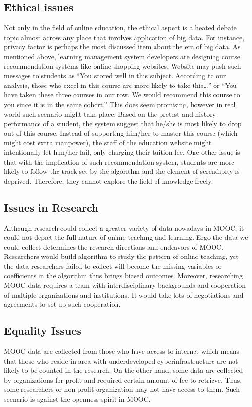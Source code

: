 \documentclass[sigconf]{acmart}
\begin{document}
\subsection{Ethical issues} 
Not only in the field of online education, the ethical aspect is a heated debate topic almost across any place that involves application of big data. For instance, privacy factor is perhaps the most discussed item about the era of big data. \cite{Manyika2011} As mentioned above, learning management system developers are designing course recommendation systems like online shopping websites. Website may push such messages to students as “You scored well in this subject. According to our analysis, those who excel in this course are more likely to take this…” or “You have taken these three courses in our row. We would recommend this course to you since it is in the same cohort.” 
This does seem promising, however in real world such scenario might take place: Based on the pretest and history performance of a student, the system suggest that he/she is most likely to drop out of this course. Instead of supporting him/her to master this course (which might cost extra manpower), the staff of the education website might intentionally let him/her fail, only charging their tuition fee.\cite{Spector2013} One other issue is that with the implication of such recommendation system, students are more likely to follow the track set by the algorithm and the element of serendipity is deprived. Therefore, they cannot explore the field of knowledge freely. \cite{Robins1989}
\subsection{Issues in Research}
Although research could collect a greater variety of data nowadays in MOOC, it could not depict the full nature of online teaching and learning. Ergo the data we could collect determines the research directions and endeavors of MOOC. Researchers would build algorithm to study the pattern of online teaching, yet the data researchers failed to collect will become the missing variables or coefficients in the algorithm thus brings biased outcomes. Moreover, researching MOOC data requires a team with interdisciplinary backgrounds and cooperation of multiple organizations and institutions. It would take lots of negotiations and agreements to set up such cooperation. \cite{Boyd2012}
\subsection{Equality Issues}
MOOC data are collected from those who have access to internet which means that those who reside in area with underdeveloped cyberinfrastructure are not likely to be counted in the research. \cite{Eynon2012} On the other hand, some data are collected by organizations for profit and required certain amount of fee to retrieve. Thus, some researchers or non-profit organization may not have access to them. Such scenario is against the openness spirit in MOOC. 
\end{document}
